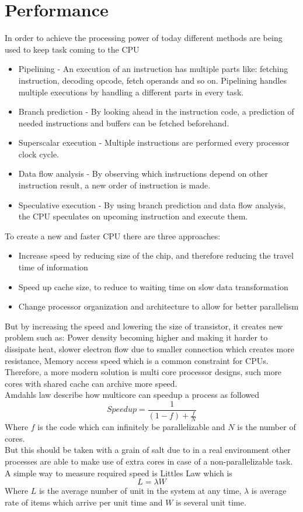 \documentclass[12pt, a4paper]{article}
\begin{document}
	\section{Performance}
		In order to achieve the processing power of today different methods are being used to keep task coming to the CPU
		\begin{itemize}
			\item Pipelining  - An execution of an instruction has multiple parts like: fetching instruction, decoding opcode, fetch operands and so on. Pipelining handles multiple executions by handling a different parts in every task.
			\item Branch prediction - By looking ahead in the instruction code, a prediction of needed instructions and buffers can be fetched beforehand.
			\item Superscalar execution - Multiple instructions are performed every processor clock cycle.
			\item Data flow analysis - By observing which instructions depend on other instruction result, a new order of instruction is made.
			\item Speculative execution - By using branch prediction and data flow analysis, the CPU speculates on upcoming instruction and execute them.
		\end{itemize}
		To create a new and faster CPU there are three approaches:
		\begin{itemize}
			\item Increase speed by reducing size of the chip, and therefore reducing the travel time of information
			\item Speed up cache size, to reduce to waiting time on slow data transformation
			\item Change processor organization and architecture to allow for better parallelism
		\end{itemize}
		But by increasing the speed and lowering the size of transistor, it creates new problem such as: Power density becoming higher and making it harder to dissipate heat, slower electron flow due to smaller connection which creates more resistance, Memory access speed which is a common constraint for CPUs.\\
		Therefore, a more modern solution is multi core processor designs, such more cores with shared cache can archive more speed.\\
		Amdahls law describe how multicore can speedup a process as followed
		$$Speedup = \frac{1}{(1-f)+\frac{f}{N}}$$
		Where $f$ is the code which can infinitely be parallelizable and $N$ is the number of cores.\\
		But this should be taken with a grain of salt due to in a real environment other processes are able to make use of extra cores in case of a non-parallelizable task.\\
		A simple way to measure required speed is Littles Law which is 
		$$L=\lambda W$$
		Where $L$ is the average number of unit in the system at any time, $\lambda$ is average rate of items which arrive per unit time and $W$ is several unit time.
\end{document}
